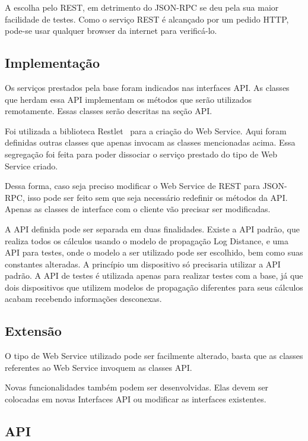 A escolha pelo REST, em detrimento do JSON-RPC se deu pela sua maior facilidade de testes. Como o serviço REST é alcançado por um pedido HTTP, pode-se usar qualquer browser da internet para verificá-lo.

\subsection{Implementação}

Os serviços prestados pela base foram indicados nas interfaces API. As classes que herdam essa API implementam os métodos que serão utilizados remotamente. Essas classes serão descritas na seção API.

Foi utilizada a biblioteca Restlet~\cite{restlet} para a criação do Web Service. Aqui foram definidas outras classes que apenas invocam as classes mencionadas acima. Essa segregação foi feita para poder dissociar o serviço prestado do tipo de Web Service criado. 

Dessa forma, caso seja preciso modificar o Web Service de REST para JSON-RPC, isso pode ser feito sem que seja necessário redefinir os métodos da API. Apenas as classes de interface com o cliente vão precisar ser modificadas.

A API definida pode ser separada em duas finalidades. Existe a API padrão, que realiza todos os cálculos usando o modelo de propagação Log Distance, e uma API para testes, onde o modelo a ser utilizado pode ser escolhido, bem como suas constantes alteradas. A princípio um dispositivo só precisaria utilizar a API padrão. A API de testes é utilizada apenas para realizar testes com a base, já que dois dispositivos que utilizem modelos de propagação diferentes para seus cálculos acabam recebendo informações desconexas.

\subsection{Extensão}

O tipo de Web Service utilizado pode ser facilmente alterado, basta que as classes referentes ao Web Service invoquem as classes API. 

Novas funcionalidades também podem ser desenvolvidas. Elas devem ser colocadas em novas Interfaces API ou modificar as interfaces existentes.

\subsection{API}

